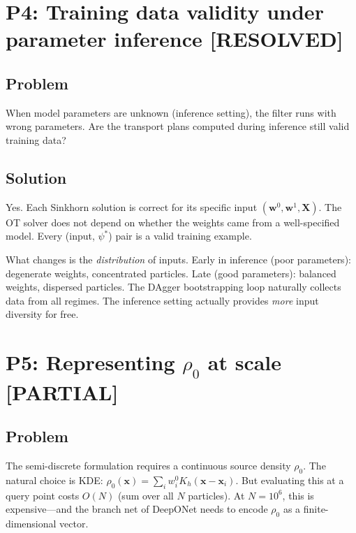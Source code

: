 \documentclass[11pt]{article}
\newcommand{\bw}{\mathbf{w}}
\newcommand{\bx}{\mathbf{x}}
\newcommand{\bX}{\mathbf{X}}
\newcommand{\statuspartial}{\textcolor{partial}{\textbf{[PARTIAL]}}}
\newcommand{\statusresolved}{\textcolor{resolved}{\textbf{[RESOLVED]}}}
\begin{document}
\section{P4: Training data validity under parameter inference \statusresolved}

\subsection*{Problem}
When model parameters are unknown (inference setting), the filter runs with wrong parameters. Are the transport plans computed during inference still valid training data?

\subsection*{Solution}
Yes. Each Sinkhorn solution is correct for its specific input $(\bw^0, \bw^1, \bX)$. The OT solver does not depend on whether the weights came from a well-specified model. Every (input, $\psi^*$) pair is a valid training example.

What changes is the \emph{distribution} of inputs. Early in inference (poor parameters): degenerate weights, concentrated particles. Late (good parameters): balanced weights, dispersed particles. The DAgger bootstrapping loop naturally collects data from all regimes. The inference setting actually provides \emph{more} input diversity for free.

\section{P5: Representing $\rho_0$ at scale \statuspartial}

\subsection*{Problem}
The semi-discrete formulation requires a continuous source density $\rho_0$. The natural choice is KDE: $\rho_0(\bx) = \sum_i w_i^0 K_h(\bx - \bx_i)$. But evaluating this at a query point costs $O(N)$ (sum over all $N$ particles). At $N = 10^6$, this is expensive---and the branch net of DeepONet needs to encode $\rho_0$ as a finite-dimensional vector.
\end{document}
